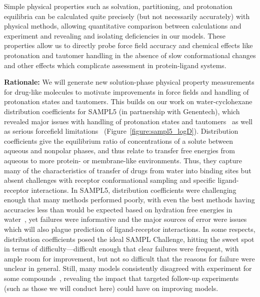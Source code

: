 \documentclass[11pt]{article}
\begin{document}
Simple physical properties such as solvation, partitioning, and protonation equilibria can be calculated quite precisely (but not necessarily accurately) with physical methods, allowing quantitative comparison between calculations and experiment and revealing and isolating deficiencies in our models. 
These properties allow us to directly probe force field accuracy and chemical effects like protonation and tautomer handling in the absence of slow conformational changes and other effects which complicate assessment in protein-ligand systems. 

{\bf Rationale:}
We will generate new solution-phase physical property measurements for drug-like molecules to motivate improvements in force fields and handling of protonation states and tautomers.
This builds on our work on water-cyclohexane distribution coefficients for SAMPL5 (in partnership with Genentech), which revealed major issues with handling of protonation states and tautomers~\cite{Bannan:2016:JComputAidedMolDes}  as well as serious forcefield limitations~\cite{paranahewage_predicting_2016} (Figure~\ref{figure:sampl5_logD}).
Distribution coefficients give the equilibrium ratio of concentrations of a solute between aqueous and nonpolar phases, and thus relate to transfer free energies from aqueous to more protein- or membrane-like environments.
Thus, they capture many of the characteristics of transfer of drugs from water into binding sites but absent challenges with receptor conformational sampling and specific ligand-receptor interactions.
In SAMPL5, distribution coefficients were challenging enough that many methods performed poorly, with even the best methods having accuracies less than would be expected based on hydration free energies in water~\cite{Bannan:2016:JComputAidedMolDes}, yet failures were informative and the major sources of error were issues which will also plague prediction of ligand-receptor interactions.
In some respects, distribution coefficients posed the ideal SAMPL Challenge, hitting the sweet spot in terms of difficulty---difficult enough that clear failures were frequent, with ample room for improvement, but not so difficult that the reasons for failure were unclear in general. 
Still, many models consistently disagreed with experiment for some compounds~\cite{paranahewage_predicting_2016, klamt_prediction_2016, Bannan:2016:JComputAidedMolDes, rustenburg_measuring_2016}, revealing the impact that targeted follow-up experiments (such as those we will conduct here) could have on improving models.
\end{document}
